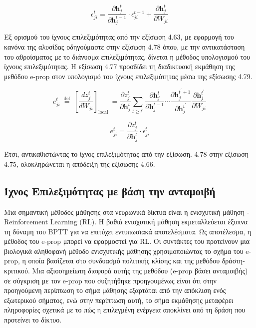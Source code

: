 \documentclass[12pt]{report}
\begin{document}
\begin{equation}
    \epsilon_{j i}^{t}=\frac{\partial \mathbf{h}_{j}^{t}}{\partial \mathbf{h}_{j}^{t-1}} \cdot \epsilon_{j i}^{t-1}+\frac{\partial \mathbf{h}_{j}^{t}}{\partial W_{j i}}
\end{equation}

Εξ ορισμού του ίχνους επιλεξιμότητας από την εξίσωση 4.63, με εφαρμογή του κανόνα της αλυσίδας οδηγούμαστε στην εξίσωση 4.78 όπου, με την αντικατάσταση του αθροίσματος με το διάνυσμα επιλεξιμότητας, δίνεται η μέθοδος υπολογισμού του ίχνους επιλεξιμότητας. Η εξίσωση 4.77 προσδίδει τη διαδικτυακή εκμάθηση της μεθόδου \textlatin{e-prop} στον υπολογισμό του ίχνους επιλεξιμότητας μέσω της εξίσωσης 4.79.

\begin{equation}
    e_{j i}^{t} \stackrel{\text { def }}{=}\left[\frac{d z_{j}^{t}}{d W_{j i}}\right]_{\text {local }} = \frac{\partial z_j^t}{\partial \mathbf{h}_j^t}\sum_{t\geq t^\prime}\frac{\partial \mathbf{h}_{j}^{t}}{\partial \mathbf{h}_{j}^{t-1}} \cdots \frac{\partial \mathbf{h}_{j}^{t^\prime + 1}}{\partial \mathbf{h}_{j}^{t^\prime}} \frac{\partial \mathbf{h}_{j}^{t^\prime}}{\partial W_{j i}}
\end{equation}

\medskip
\begin{equation}
    e_{j i}^{t} = \frac{\partial z_j^t}{\partial \mathbf{h}_j^t} \cdot \epsilon_{j i}^{t}
\end{equation}

Έτσι, αντικαθιστώντας το ίχνος επιλεξιμότητας από την εξίσωση. 4.78 στην εξίσωση 4.75, ολοκληρώνεται η απόδειξη της εξίσωσης 4.66.

\subsection{Ίχνος Επιλεξιμότητας με βάση την ανταμοιβή}

Μια σημαντική μέθοδος μάθησης στα νευρωνικά δίκτυα είναι η ενισχυτική μάθηση - \textlatin{Reinforcement Learning (RL)}. Η βαθιά ενισχυτική μάθηση εκμεταλλεύεται έξυπνα τη δύναμη του \textlatin{BPTT} για να επιτύχει εντυπωσιακά αποτελέσματα. Ως αποτέλεσμα, η μέθοδος του \textlatin{e-prop} μπορεί να εφαρμοστεί για \textlatin{RL}. Οι συντάκτες του \cite{Bellec2020} προτείνουν μια βιολογικά αληθοφανή μέθοδο ενισχυτικής μάθησης χρησιμοποιώντας το σχήμα του \textlatin{e-prop}, η οποία βασίζεται στο συνδυασμό πολιτικής κλίσης και της μεθόδου δράστη-κριτικού. Μια αξιοσημείωτη διαφορά αυτής της μεθόδου (\textlatin{e-prop} βάσει ανταμοιβής) σε σύγκριση με τον \textlatin{e-prop} που συζητήθηκε προηγουμένως είναι ότι στην προηγούμενη περίπτωση το σήμα μάθησης εξαρτάται από την απόκλιση ενός εξωτερικού σήματος, ενώ στην περίπτωση αυτή, το σήμα εκμάθησης μεταφέρει πληροφορίες σχετικά με το πώς η επιλεγμένη ενέργεια αποκλίνει από τη δράση που προτείνει το δίκτυο.
\end{document}
